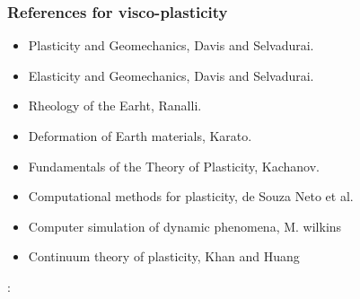 \Literature \cite{buwa06,budr08,rana97a,rana97b}






\subsubsection{References for visco-plasticity}

\begin{itemize}
\item Plasticity and Geomechanics, Davis and Selvadurai. \cite{dase02}
\item Elasticity and Geomechanics, Davis and Selvadurai. \cite{dase96}
\item Rheology of the Earht, Ranalli. \cite{ranalli}
\item Deformation of Earth materials, Karato. \cite{kara08}
\item Fundamentals of the Theory of Plasticity, Kachanov. \cite{kacha04} 
\item Computational methods for plasticity, de Souza Neto et al. \cite{depo}
\item Computer simulation of dynamic phenomena, M. wilkins \cite{wilk}
\item Continuum theory of plasticity, Khan and Huang \cite{khhu}
\end{itemize}

\Literature: \cite{zien75,zihl75,zico74,zihp95,ziph95,lova01,thfb08}




